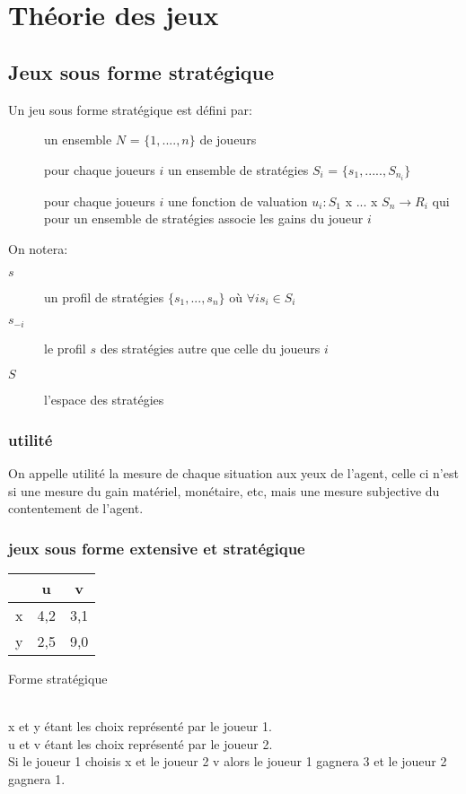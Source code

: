 \pagebreak
\chapter{Théorie des jeux}
\pagebreak

\section{Jeux sous forme stratégique}

Un jeu sous forme stratégique est défini par:
\begin{description}
\item[] un ensemble $N$ = $\{1,....,n\}$ de joueurs
\item[] pour chaque joueurs $i$ un ensemble de stratégies $S_i$ = $\{s_1,.....,S_{n_i}\}$
\item[] pour chaque joueurs $i$ une fonction de valuation $u_i : S_1$ x ... x $S_n \rightarrow R_i$ qui pour un ensemble de stratégies associe les gains du joueur $i$
\end{description}

On notera:\\
\begin{description}
\item[$s$] un profil de stratégies $\{s_1,...,s_n\}$ où $\forall i s_i \in S_i$
\item[$s_{-i}$] le profil $s$ des stratégies autre que celle du joueurs $i$
\item[$S$] l'espace des stratégies 
\end{description}

\subsection{utilité}
On appelle utilité la mesure de chaque situation aux yeux de l'agent, celle ci n'est si une mesure du gain matériel, monétaire, etc, mais une mesure subjective du contentement de l'agent.
\pagebreak
\subsection{jeux sous forme extensive et stratégique}

\begin{center}
\begin{tabular}{c|cc}
$ $ & u & v\\
\hline
x & 4,2 & 3,1\\
y & 2,5 & 9,0\\
\end{tabular}
\end{center}
\begin{center}
Forme stratégique
\end{center}
\ \\
x et y étant les choix représenté par le joueur 1.\\
u et v étant les choix représenté par le joueur 2.\\
Si le joueur 1 choisis x et le joueur 2 v alors le joueur 1 gagnera 3 et le joueur 2 gagnera 1.\\

